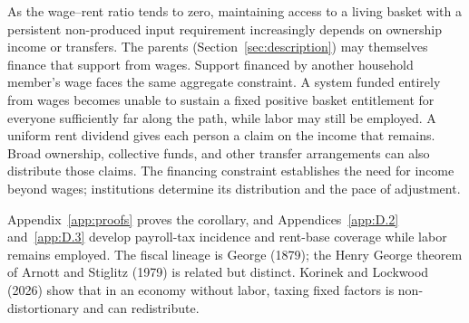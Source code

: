 \documentclass[12pt]{article}
\theoremstyle{plain}
\theoremstyle{definition}
\theoremstyle{remark}
\begin{document}
As the wage--rent ratio tends to zero, maintaining access to a living basket with a persistent non-produced input requirement increasingly depends on ownership income or transfers.
The parents (Section~\ref{sec:description}) may themselves finance that support from wages.
Support financed by another household member's wage faces the same aggregate constraint. A system funded entirely from wages becomes unable to sustain a fixed positive basket entitlement for everyone sufficiently far along the path, while labor may still be employed. A uniform rent dividend gives each person a claim on the income that remains. Broad ownership, collective funds, and other transfer arrangements can also distribute those claims. The financing constraint establishes the need for income beyond wages; institutions determine its distribution and the pace of adjustment.

Appendix~\ref{app:proofs} proves the corollary, and Appendices~\ref{app:D.2} and~\ref{app:D.3} develop payroll-tax incidence and rent-base coverage while labor remains employed. The fiscal lineage is George (1879); the Henry George theorem of Arnott and Stiglitz (1979) is related but distinct.
Korinek and Lockwood (2026) show that in an economy without labor, taxing fixed factors is non-distortionary and can redistribute.
\end{document}
